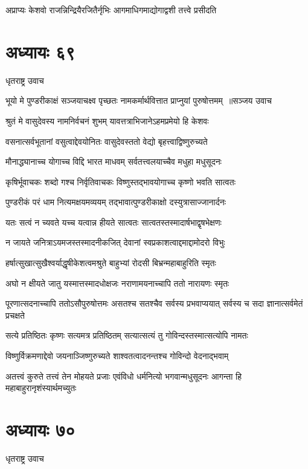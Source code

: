 \twolineshloka
{अप्राप्यः केशवो राजन्निन्द्रियैरजितैर्नृभिः}
{आगमाधिगमाद्योगाद्वशी तत्त्वे प्रसीदति}


\chapter{अध्यायः ६९}
\twolineshloka
{धृतराष्ट्र उवाच}
{}


\threelineshloka
{भूयो मे पुण्डरीकाक्षं सञ्जयाचक्ष्व पृच्छतः}
{नामकर्मार्थवित्तात प्राप्नुयां पुरुषोत्तमम् ॥सञ्जय उवाच}
{}


\twolineshloka
{श्रुतं मे वासुदेवस्य नामनिर्वचनं शुभम्}
{यावत्तत्राभिजानेऽहमप्रमेयो हि केशवः}


\twolineshloka
{वसनात्सर्वभूतानां वसुत्वाद्देवयोनितः}
{वासुदेवस्ततो वेद्यो बृहत्त्वाद्विष्णुरुच्यते}


\twolineshloka
{मौनाद्ध्यानाच्च योगाच्च विद्दि भारत माधवम्}
{सर्वतत्त्वलयाच्चैव मधुहा मधुसूदनः}


\twolineshloka
{कृषिर्भूवाचकः शब्दो गश्च निर्वृतिवाचकः}
{विष्णुस्तद्भावयोगाच्च कृष्णो भवति सात्वतः}


\twolineshloka
{पुण्डरीकं परं धाम नित्यमक्षयमव्ययम्}
{तद्भावात्पुण्डरीकाक्षो दस्युत्रासाज्जानार्दनः}


\twolineshloka
{यतः सत्वं न च्यवते यच्च यत्वान्न हीयते}
{सात्वतः सात्वतस्तस्मादार्षभाद्वृषभेक्षणः}


\twolineshloka
{न जायते जनित्राऽयमजस्तस्मादनीकजित्}
{देवानां स्वप्रकाशत्वाद्दमाद्दामोदरो विभुः}


\twolineshloka
{हर्षात्सुखात्सुखैश्वर्याद्धृषीकेशत्वमश्रुते}
{बाहुभ्यां रोदसी बिभ्रन्महाबाहुरिति स्मृतः}


\twolineshloka
{अघो न क्षीयते जातु यस्मात्तस्मादधोक्षजः}
{नराणामयनाच्चापि ततो नारायणः स्मृतः}


\threelineshloka
{पूरणात्सदनाच्चापि ततोऽसौपुरुषोत्तमः}
{असतश्च सतश्चैव सर्वस्य प्रभवाप्ययात्}
{सर्वस्य च सदा ज्ञानात्सर्वमेतं प्रचक्षते}


\twolineshloka
{सत्ये प्रतिष्ठितः कृष्णः सत्यमत्र प्रतिष्ठितम्}
{सत्यात्सत्यं तु गोविन्दस्तस्मात्सत्योपि नामतः}


\twolineshloka
{विष्णुर्विक्रमणाद्देवो जयनाञ्जिष्णुरुच्यते}
{शाश्वतत्वादनन्तश्च गोविन्दो वेदनाद्भवाम्}


अतत्त्वं कुरुते तत्त्वं तेन मोहयते प्रजाः
\twolineshloka
{एवंविधो धर्मनित्यो भगवान्मधुसूदनः}
{आगन्ता हि महाबाहुरानृशंस्यार्थमच्युतः}


\chapter{अध्यायः ७०}
\twolineshloka
{धृतराष्ट्र उवाच}
{}


